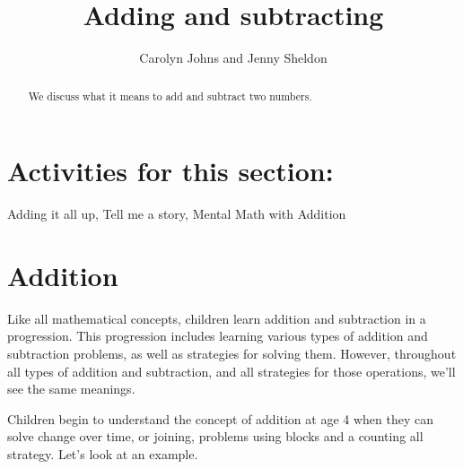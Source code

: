 \documentclass{ximera}
\title{Adding and subtracting}
\author{Carolyn Johns and Jenny Sheldon}
\begin{document}
\begin{abstract}
We discuss what it means to add and subtract two numbers.
\end{abstract}
\maketitle

\section{Activities for this section:} Adding it all up, Tell me a story, Mental Math with Addition


\section{Addition}

Like all mathematical concepts, children learn addition and subtraction in a progression. This progression includes learning various types of addition and subtraction problems, as well as strategies for solving them. However, throughout all types of addition and subtraction, and all strategies for those operations, we'll see the same meanings.

Children begin to understand the concept of addition at age 4 when they can solve change over time, or joining, problems using blocks and a counting all strategy. Let's look at an example.
\end{document}
